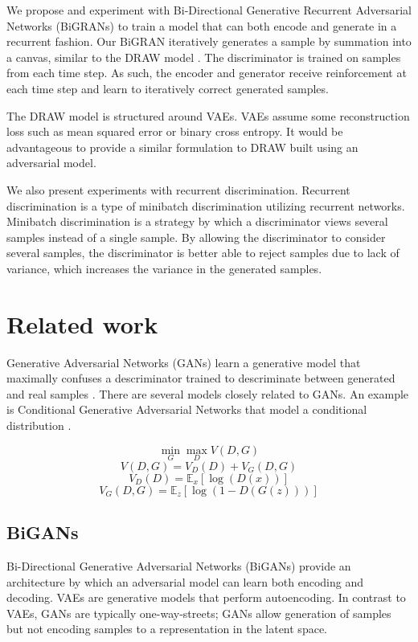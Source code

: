 \documentclass{article}
\begin{document}
We propose and experiment with Bi-Directional Generative Recurrent Adversarial Networks (BiGRANs) to train a model that can both encode and generate in a recurrent fashion. Our BiGRAN iteratively generates a sample by summation into a canvas, similar to the DRAW model \cite{Gregor2015}. The discriminator is trained on samples from each time step. As such, the encoder and generator receive reinforcement at each time step and learn to iteratively correct generated samples.

The DRAW model is structured around VAEs. VAEs assume some reconstruction loss such as mean squared error or binary cross entropy. It would be advantageous to provide a similar formulation to DRAW built using an adversarial model.

We also present experiments with recurrent discrimination. Recurrent discrimination is a type of minibatch discrimination utilizing recurrent networks. Minibatch discrimination is a strategy by which a discriminator views several samples instead of a single sample. By allowing the discriminator to consider several samples, the discriminator is better able to reject samples due to lack of variance, which increases the variance in the generated samples.

\section{Related work}

Generative Adversarial Networks (GANs) learn a generative model that maximally confuses a descriminator trained to descriminate between generated and real samples \cite{Goodfellow2014}. There are several models closely related to GANs. An example is Conditional Generative Adversarial Networks that model a conditional distribution \cite{Mirza2016}.


$$ \min_G \max_D V(D,G) $$
$$ V(D,G) = V_D(D) + V_G(D,G) $$
$$ V_D(D) = \mathbb{E}_x [\log(D(x))] $$
$$ V_G(D,G) = \mathbb{E}_z [\log(1-D(G(z)))] $$

\subsection{BiGANs}

Bi-Directional Generative Adversarial Networks (BiGANs) \cite{Donahue2016} provide an architecture by which an adversarial model can learn both encoding and decoding. VAEs are generative models that perform autoencoding. In contrast to VAEs, GANs are typically one-way-streets; GANs allow generation of samples but not encoding samples to a representation in the latent space.
\end{document}
